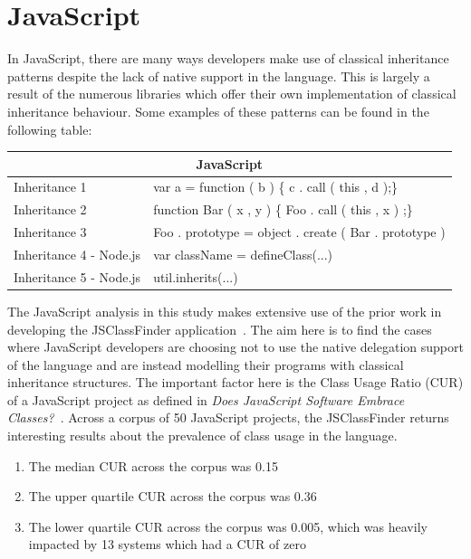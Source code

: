 \section{JavaScript}
In JavaScript, there are many ways developers make use of classical inheritance patterns despite the lack of native support in the language. This is largely a result of the numerous libraries which offer their own implementation of classical inheritance behaviour. Some examples of these patterns can be found in the following table:
\begin{tabular}{|p{5cm}|p{9cm}|}
	\hline
	\multicolumn{2}{|c|}{JavaScript}                                                                                                                                                                  \\ \hline
	Inheritance 1                  & var a = function ( b ) \{    c . call ( this , d );\}                                                                                      \\ \hline
	Inheritance 2                  & function Bar   ( x , y ) \{    Foo . call ( this , x ) ;\}                                                                                 \\ \hline
	Inheritance 3                  & Foo . prototype = object . create ( Bar . prototype )                                                                                      \\ \hline
	Inheritance 4 - Node.js        & var className = defineClass(...)                                                                                                           \\ \hline
	Inheritance 5 - Node.js        & util.inherits(...)                                                                                                                         \\ \hline
\end{tabular}
\newline\newline\newline
The JavaScript analysis in this study makes extensive use of the prior work in developing the JSClassFinder application~\cite{JSClassFinder}. The aim here is to find the cases where JavaScript developers are choosing not to use the native delegation support of the language and are instead modelling their programs with classical inheritance structures. The important factor here is the Class Usage Ratio (CUR) of a JavaScript project as defined in \textit{Does JavaScript Software Embrace Classes?~\cite{JSClassFinder}}. Across a corpus of 50 JavaScript projects, the JSClassFinder returns interesting results about the prevalence of class usage in the language.
\begin{enumerate}
	\item The median CUR across the corpus was 0.15
	\item The upper quartile CUR across the corpus was 0.36
	\item The lower quartile CUR across the corpus was 0.005, which was heavily impacted by 13 systems which had a CUR of zero
\end{enumerate}
